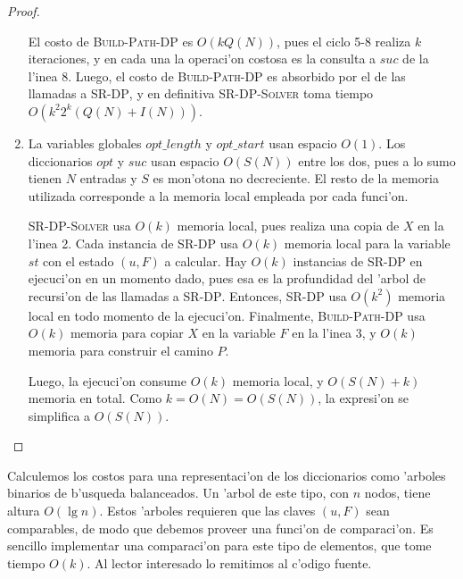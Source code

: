 \begin{theorem}
\begin{proof}
\begin{enumerate}
El costo de \textsc{Build-Path-DP} es $O(k Q(N))$, pues el ciclo 5-8 realiza $k$ iteraciones, y en cada una la operaci'on costosa es la consulta a $suc$ de la l'inea 8. Luego, el costo de \textsc{Build-Path-DP} es absorbido por el de las llamadas a \textsc{SR-DP}, y en definitiva \textsc{SR-DP-Solver} toma tiempo $O(k^2 2^k(Q(N) + I(N)))$.

\item La variables globales $opt\_length$ y $opt\_start$ usan espacio $O(1)$. Los diccionarios $opt$ y $suc$ usan espacio $O(S(N))$ entre los dos, pues a lo sumo tienen $N$ entradas y $S$ es mon'otona no decreciente. El resto de la memoria utilizada corresponde a la memoria local empleada por cada funci'on.

\textsc{SR-DP-Solver} usa $O(k)$ memoria local, pues realiza una copia de $X$ en la l'inea 2. Cada instancia de \textsc{SR-DP} usa $O(k)$ memoria local para la variable $st$ con el estado $(u, F)$ a calcular. Hay $O(k)$ instancias de \textsc{SR-DP} en ejecuci'on en un momento dado, pues esa es la profundidad del 'arbol de recursi'on de las llamadas a \textsc{SR-DP}. Entonces, \textsc{SR-DP} usa $O(k^2)$ memoria local en todo momento de la ejecuci'on. Finalmente, \textsc{Build-Path-DP} usa $O(k)$ memoria para copiar $X$ en la variable $F$ en la l'inea 3, y $O(k)$ memoria para construir el camino $P$.

Luego, la ejecuci'on consume $O(k)$ memoria local, y $O(S(N) + k)$ memoria en total. Como $k = O(N) = O(S(N))$, la expresi'on se simplifica a $O(S(N))$.
\end{enumerate}
\end{proof}
\end{theorem}

Calculemos los costos para una representaci'on de los diccionarios como 'arboles binarios de b'usqueda balanceados. Un 'arbol de este tipo, con $n$ nodos, tiene altura $O(\lg n)$. Estos 'arboles requieren que las claves $(u, F)$ sean comparables, de modo que debemos proveer una funci'on de comparaci'on. Es sencillo implementar una comparaci'on para este tipo de elementos, que tome tiempo $O(k)$. Al lector interesado lo remitimos al c'odigo fuente.

